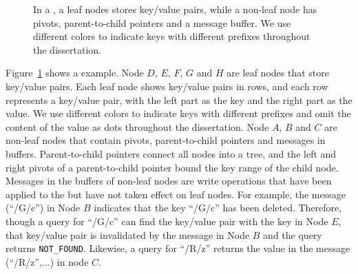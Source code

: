 \begin{figure}[t]
    \caption[A \bet example]{\label{fig:bet}
        In a \bet, a leaf nodes stores key/value pairs, while a non-leaf node
        has pivots, parent-to-child pointers and a message buffer.
        We use different colors to indicate keys with different prefixes
        throughout the dissertation.}
\end{figure}

Figure~\ref{fig:bet} shows a \bet example.
Node $D$, $E$, $F$, $G$ and $H$ are leaf nodes that store key/value pairs.
Each leaf node shows key/value pairs in rows,
and each row represents a key/value pair, with the left part as the key and
the right part as the value.
We use different colors to indicate keys with different prefixes and omit the
content of the value as dots throughout the dissertation.
Node $A$, $B$ and $C$ are non-leaf nodes that contain pivots, parent-to-child
pointers and messages in buffers.
Parent-to-child pointers connect all nodes into a tree, and the left and right
pivots of a parent-to-child pointer bound the key range of the child node.
Messages in the buffers of non-leaf nodes are write operations that have been
applied to the \bet but have not taken effect on leaf nodes.
For example, the message \delm(``/G/c'') in Node $B$ indicates that the key
``/G/c'' has been deleted.
Therefore, though a query for ``/G/c'' can find the key/value pair with the
key in Node $E$,
that key/value pair is invalidated by the message in Node $B$ and the
query returns \texttt{NOT\_FOUND}.
Likewise, a query for ``/R/z'' returns the value in the message
\putm(``/R/z'',...) in node $C$.

